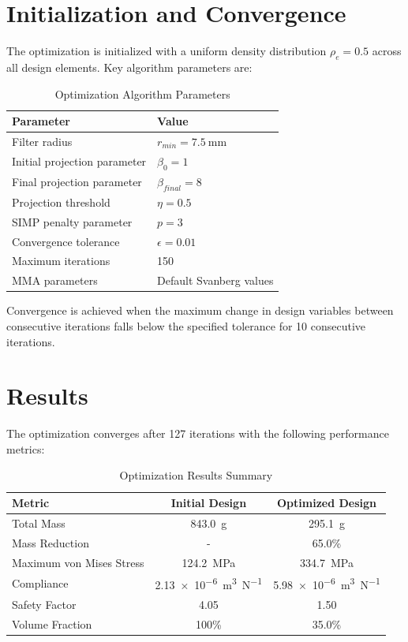 \documentclass[11pt]{report}
\newcommand{\rhoe}{\rho_e}
\newcommand{\penalty}{p}
\begin{document}
\section{Initialization and Convergence}
The optimization is initialized with a uniform density distribution $\rhoe = 0.5$ across all design elements. Key algorithm parameters are:
\begin{table}[h]
\centering
\caption{Optimization Algorithm Parameters}
\begin{tabular}{@{}ll@{}}
\toprule
Parameter & Value \\ 
\midrule
Filter radius & $r_{min} = \SI{7.5}{\milli\meter}$ \\
Initial projection parameter & $\beta_0 = 1$ \\
Final projection parameter & $\beta_{final} = 8$ \\
Projection threshold & $\eta = 0.5$ \\
SIMP penalty parameter & $\penalty = 3$ \\
Convergence tolerance & $\epsilon = 0.01$ \\
Maximum iterations & 150 \\
MMA parameters & Default Svanberg values \\
\bottomrule
\end{tabular}
\end{table}
Convergence is achieved when the maximum change in design variables between consecutive iterations falls below the specified tolerance for 10 consecutive iterations.

\section{Results}
The optimization converges after 127 iterations with the following performance metrics:
\begin{table}[h]
\centering
\caption{Optimization Results Summary}
\begin{tabular}{@{}lcc@{}}
\toprule
Metric & Initial Design & Optimized Design \\ 
\midrule
Total Mass & \SI{843.0}{\gram} & \SI{295.1}{\gram} \\
Mass Reduction & - & 65.0\% \\
Maximum von Mises Stress & \SI{124.2}{\mega\pascal} & \SI{334.7}{\mega\pascal} \\
Compliance & \SI{2.13e-6}{\meter\cubed\per\newton} & \SI{5.98e-6}{\meter\cubed\per\newton} \\
Safety Factor & 4.05 & 1.50 \\
Volume Fraction & 100\% & 35.0\% \\
\bottomrule
\end{tabular}
\end{table}
\end{document}
